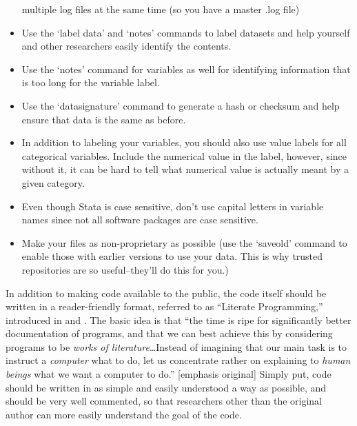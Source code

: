 \documentclass[12pt] {article}
\begin{document}
\begin{itemize}
  multiple log files at the same time (so you have a master .log file)
\item
  Use the `label data' and `notes' commands to label datasets and help yourself and other researchers easily identify the contents.
\item
  Use the `notes' command for variables as well for identifying information that is too long for the variable label.
\item
  Use the `datasignature' command to generate a hash or checksum and help ensure that data is
  the same as before.
\item
  In addition to labeling your variables, you should also use value labels for all categorical variables. Include the
  numerical value in the label, however, since without it, it can be hard to tell what numerical value is actually meant by a given category. 
\item
  Even though Stata is case sensitive, don't use capital letters in variable names since not all software packages
  are case sensitive.
\item
  Make your files as non-proprietary as possible (use the `saveold'
  command to enable those with earlier versions to use your data. This
  is why trusted repositories are so useful--they'll do this for you.)
\end{itemize}

In addition to making code available to the public, the code itself
should be written in a reader-friendly format, referred to as ``Literate
Programming,'' introduced in \cite{knuth_literate_1984} and \cite{knuth_literate_1992}. The basic
idea is that ``the time is ripe for significantly better documentation
of programs, and that we can best achieve this by considering programs
to be \emph{works of literature}\ldots{}Instead of imagining that our
main task is to instruct a \emph{computer} what to do, let us
concentrate rather on explaining to \emph{human beings} what we want a
computer to do.'' {[}emphasis original{]} Simply put, code should be
written in as simple and easily understood a way as possible, and should
be very well commented, so that researchers other than the original
author can more easily understand the goal of the code.
\end{document}
